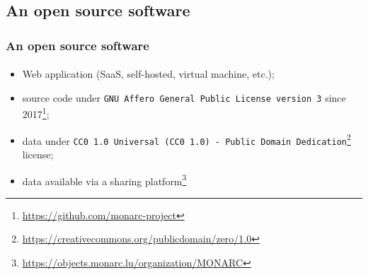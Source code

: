 \subsection{An open source software}
\begin{frame}
\frametitle{An open source software}
\framesubtitle{}
    \begin{itemize}
        \item Web application (SaaS, self-hosted, virtual machine, etc.);
        \item source code under \texttt{GNU Affero General Public License version 3} since 2017\footnote{\url{https://github.com/monarc-project}};
        \item data under \texttt{CC0 1.0 Universal (CC0 1.0) - Public Domain Dedication}\footnote{\url{https://creativecommons.org/publicdomain/zero/1.0}} license;
        \item data available via a sharing platform\footnote{\url{https://objects.monarc.lu/organization/MONARC}}
    \end{itemize}
\end{frame}
